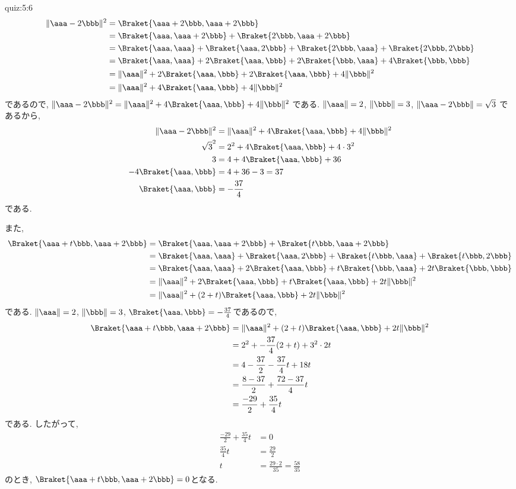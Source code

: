 \begin{answerof}{quiz:5:6}
  \begin{align*}
    \|\aaa-2\bbb\|^2
    &=\Braket{\aaa+2\bbb,\aaa+2\bbb}\\
    &=\Braket{\aaa,\aaa+2\bbb}+\Braket{2\bbb,\aaa+2\bbb}\\
    &=\Braket{\aaa,\aaa}+\Braket{\aaa,2\bbb}+\Braket{2\bbb,\aaa}+\Braket{2\bbb,2\bbb}\\
    &=\Braket{\aaa,\aaa}+2\Braket{\aaa,\bbb}+2\Braket{\bbb,\aaa}+4\Braket{\bbb,\bbb}\\
    &=\|\aaa\|^2+2\Braket{\aaa,\bbb}+2\Braket{\aaa,\bbb}+4\|\bbb\|^2\\
    &=\|\aaa\|^2+4\Braket{\aaa,\bbb}+4\|\bbb\|^2
  \end{align*}
  であるので,
  $\|\aaa-2\bbb\|^2=\|\aaa\|^2+4\Braket{\aaa,\bbb}+4\|\bbb\|^2$
  である.
  $\|\aaa\|=2$,
  $\|\bbb\|=3$,
  $\|\aaa-2\bbb\|=\sqrt{3}$
  であるから,
  \begin{align*}
    \|\aaa-2\bbb\|^2&=\|\aaa\|^2+4\Braket{\aaa,\bbb}+4\|\bbb\|^2\\
    \sqrt{3}^2&=2^2+4\Braket{\aaa,\bbb}+4\cdot 3^2\\
    3&=4+4\Braket{\aaa,\bbb}+36\\
    -4\Braket{\aaa,\bbb}&=4+36-3=37\\
    \Braket{\aaa,\bbb}&=-\frac{37}{4}\\
  \end{align*}
  である.

  また,
  \begin{align*}
    \Braket{\aaa+t\bbb,\aaa+2\bbb}
    &=\Braket{\aaa,\aaa+2\bbb}+\Braket{t\bbb,\aaa+2\bbb}\\
    &=\Braket{\aaa,\aaa}+\Braket{\aaa,2\bbb}+\Braket{t\bbb,\aaa}+\Braket{t\bbb,2\bbb}\\
    &=\Braket{\aaa,\aaa}+2\Braket{\aaa,\bbb}+t\Braket{\bbb,\aaa}+2t\Braket{\bbb,\bbb}\\
    &=\|\aaa\|^2+2\Braket{\aaa,\bbb}+t\Braket{\aaa,\bbb}+2t\|\bbb\|^2\\
    &=\|\aaa\|^2+(2+t)\Braket{\aaa,\bbb}+2t\|\bbb\|^2
  \end{align*}
  である.
  $\|\aaa\|=2$,
  $\|\bbb\|=3$,
  $\Braket{\aaa,\bbb}=-\frac{37}{4}$であるので,
  \begin{align*}
    \Braket{\aaa+t\bbb,\aaa+2\bbb}
    &=\|\aaa\|^2+(2+t)\Braket{\aaa,\bbb}+2t\|\bbb\|^2\\
    &=2^2+-\frac{37}{4}(2+t)+ 3^2\cdot2t\\
    &=4-\frac{37}{2}-\frac{37}{4}t+18t\\
    &=\frac{8-37}{2}+\frac{72-37}{4}t\\
    &=\frac{-29}{2}+\frac{35}{4}t
  \end{align*}
  である.
  したがって,
  \begin{align*}
    \frac{-29}{2}+\frac{35}{4}t&=0\\
    \frac{35}{4}t&=\frac{29}{2}\\
    t&=\frac{29\cdot 2}{35}=\frac{58}{35}
  \end{align*}
  のとき,
  $\Braket{\aaa+t\bbb,\aaa+2\bbb}=0$となる.
\end{answerof}

